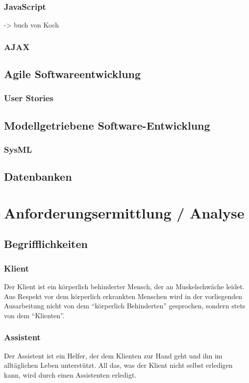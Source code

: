 \documentclass[12pt,a4paper,titlepage]{article} %
\begin{document}
\subsubsection{JavaScript}
-> buch von Koch
\subsubsection{AJAX}
\subsection{Agile Softwareentwicklung}
\subsubsection{User Stories}
\subsection{Modellgetriebene Software-Entwicklung}
\subsubsection{SysML}
\subsection{Datenbanken} %

\section{Anforderungsermittlung / Analyse} %
\subsection{Begrifflichkeiten}

\subsubsection{Klient}
Der Klient ist ein körperlich behinderter Mensch, der an Muskelschwäche leidet. %
Aus Respekt vor dem körperlich erkrankten Menschen wird in der vorliegenden Ausarbeitung nicht von dem \enquote{körperlich Behinderten} gesprochen, sondern stets von dem \enquote{Klienten}.

\subsubsection{Assistent}
Der Assistent ist ein Helfer, der dem Klienten zur Hand geht und ihn im alltäglichen Leben unterstützt. All das, was der Klient nicht selbst erledigen kann, wird durch einen Assistenten erledigt.
\end{document}
